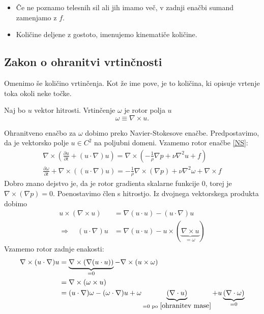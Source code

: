 \documentclass[mat2, tisk]{fmfdelo}
\begin{document}
\begin{opomba}
  \hfil
\begin{itemize}
  \item Če ne poznamo telesnih sil ali jih imamo več, v zadnji enačbi sumand zamenjamo z $f$.
  \item Količine deljene z gostoto, imenujemo kinematiče količine.
\end{itemize}
\end{opomba}

\subsection{Zakon o ohranitvi vrtinčnosti}

Omenimo še količino vrtinčenja. Kot že ime pove, je to količina, ki opisuje vrtenje toka okoli neke točke. 
\begin{definicija}
Naj bo $u$ vektor hitrosti. Vrtinčenje $\omega$ je rotor polja $u$
\begin{equation}
\omega \equiv \nabla \times u.
\end{equation}
\end{definicija}
Ohranitveno enačbo za $\omega$ dobimo preko Navier-Stokesove enačbe. Predpostavimo, 
da je vektorsko polje $u \in C^2$ na poljubni domeni. Vzamemo rotor enačbe \eqref{NS}:
\begin{align*}
\nabla \times (\frac{\partial u}{\partial t} + (u\cdot \nabla)u) = \nabla\times (- \frac{1}{\rho}\nabla p + \nu \nabla^2 u + f) \\
\frac{\partial \omega}{\partial t} + \nabla \times ((u\cdot \nabla)u) = - \frac{1}{\rho} \nabla \times (\nabla p) + \nu\nabla^2 \omega + \nabla \times f
\end{align*}
Dobro znano dejstvo je, da je rotor gradienta skalarne funkcije $0$, torej je 
$\nabla \times (\nabla p) = 0$. Poenostavimo člen s hitrostjo. Iz dvojnega vektorskega 
produkta dobimo 
\begin{align*}
u \times (\nabla \times u) &=  \nabla(u\cdot u) - (u\cdot \nabla)u \\
\Longrightarrow \quad(u\cdot \nabla)u &= \nabla (u\cdot u) - u\times (\underbrace{\nabla \times u}_{= \omega})
\end{align*}
Vzamemo rotor zadnje enakosti:
\begin{align*}
\nabla \times (u\cdot \nabla)u &= \underbrace{\nabla \times (\nabla(u\cdot u))}_{= 0} - \nabla \times (u \times \omega) \\
&= \nabla \times (\omega \times u) \\
&= (u\cdot \nabla)\omega - (\omega \cdot \nabla)u + \omega\underbrace{(\nabla \cdot u)}_{= 0 \text{ po } \eqref{ohranitev mase}} + u \underbrace{(\nabla \cdot \omega)}_{= 0}
\end{align*}
\end{document}
